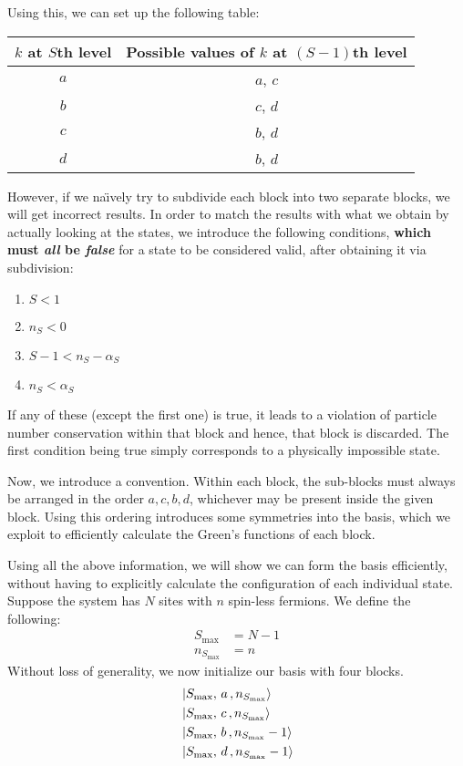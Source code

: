 	Using this, we can set up the following table:
	\begin{table}[h!]
		\centering
		\begin{tabular}{cc}
			\toprule
			$ k $ at $ S $th level & Possible values of $ k $ at $ (S-1) $th level\\
			\midrule
			$ a $ & $ a $, $ c $\\
			$ b $ & $ c $, $ d $\\
			$ c $ & $ b $, $ d $\\
			$ d $ & $ b $, $ d $\\
			\bottomrule
		\end{tabular}
	\end{table}
	\pagebreak
	
	However, if we na\"{\i}vely try to subdivide each block into two separate blocks, we will get incorrect results. In order to match the results with what we obtain by actually looking at the states, we introduce the following conditions, \textbf{which must \emph{all} be \emph{false}} for a state to be considered valid, after obtaining it via subdivision:
	\begin{enumerate}
		\item $ S < 1 $
		\item $ n_S < 0 $
		\item $ S - 1 < n_S - \alpha_S $
		\item $ n_S < \alpha_S $
	\end{enumerate}
	If any of these (except the first one) is true, it leads to a violation of particle number conservation within that  block and hence, that block is discarded. The first condition being true simply corresponds to a physically impossible state.
	
	Now, we introduce a convention. Within each block, the sub-blocks must always be arranged in the order $ a, c, b, d $, whichever may be present inside the given block. Using this ordering introduces some symmetries into the basis, which we exploit to efficiently calculate the Green's functions of each block.
	
	Using all the above information, we will show we can form the basis efficiently, without having to explicitly calculate the configuration of each individual state. Suppose the system has $ N $ sites with $ n $ spin-less fermions. We define the following:
	\begin{align*}
		S_{\mathrm{max}} &= N-1\\
		n_{S_{\mathrm{max}}} &= n
	\end{align*}
	Without loss of generality, we now initialize our basis with four blocks.
	\begin{align*}
		&\ket{S_{\mathrm{max}}, \,a\,, n_{S_{\mathrm{max}}}}\\
		&\ket{S_{\mathrm{max}}, \,c\,, n_{S_{\mathrm{max}}}}\\
		&\ket{S_{\mathrm{max}}, \,b\,, n_{S_{\mathrm{max}}}-1}\\
		&\ket{S_{\mathrm{max}}, \,d\,, n_{S_{\mathrm{max}}}-1}
	\end{align*}
	
